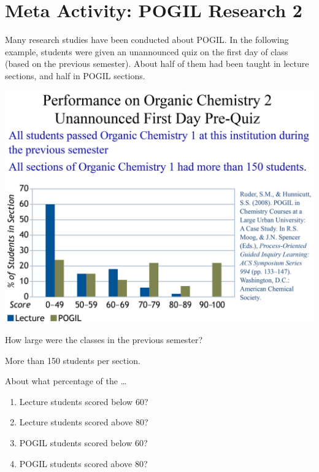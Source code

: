 \section*{Meta Activity: POGIL Research 2}

Many research studies have been conducted about POGIL.
In the following example, students were given an unannounced quiz on the first day of class (based on the previous semester).
About half of them had been taught in lecture sections, and half in POGIL sections.

\begin{center}
\includegraphics[width=0.625\linewidth]{pogil-prequiz.png}
\end{center}




\Q How large were the classes in the previous semester?

\begin{answer}[2em]
More than 150 students per section.
\end{answer}

\vspace{1ex}


\Q About what percentage of the \ldots

\begin{multicols}{2}
\begin{enumerate}

\item Lecture students scored below 60? 
\item Lecture students scored above 80? 

\item POGIL students scored below 60? 
\item POGIL students scored above 80? 

\end{enumerate}
\end{multicols}


